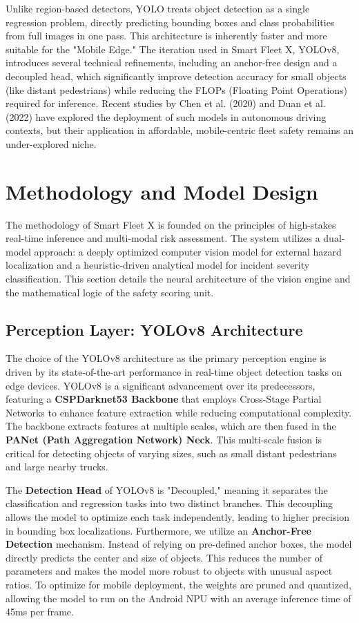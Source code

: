 \documentclass[conference]{IEEEtran}
\begin{document}
Unlike region-based detectors, YOLO treats object detection as a single regression problem, directly predicting bounding boxes and class probabilities from full images in one pass. This architecture is inherently faster and more suitable for the "Mobile Edge." The iteration used in Smart Fleet X, YOLOv8, introduces several technical refinements, including an anchor-free design and a decoupled head, which significantly improve detection accuracy for small objects (like distant pedestrians) while reducing the FLOPs (Floating Point Operations) required for inference. Recent studies by Chen et al. (2020) and Duan et al. (2022) have explored the deployment of such models in autonomous driving contexts, but their application in affordable, mobile-centric fleet safety remains an under-explored niche.

\section{Methodology and Model Design}

The methodology of Smart Fleet X is founded on the principles of high-stakes real-time inference and multi-modal risk assessment. The system utilizes a dual-model approach: a deeply optimized computer vision model for external hazard localization and a heuristic-driven analytical model for incident severity classification. This section details the neural architecture of the vision engine and the mathematical logic of the safety scoring unit.

\subsection{Perception Layer: YOLOv8 Architecture}
The choice of the YOLOv8 architecture as the primary perception engine is driven by its state-of-the-art performance in real-time object detection tasks on edge devices. YOLOv8 is a significant advancement over its predecessors, featuring a \textbf{CSPDarknet53 Backbone} that employs Cross-Stage Partial Networks to enhance feature extraction while reducing computational complexity. The backbone extracts features at multiple scales, which are then fused in the \textbf{PANet (Path Aggregation Network) Neck}. This multi-scale fusion is critical for detecting objects of varying sizes, such as small distant pedestrians and large nearby trucks.

The \textbf{Detection Head} of YOLOv8 is "Decoupled," meaning it separates the classification and regression tasks into two distinct branches. This decoupling allows the model to optimize each task independently, leading to higher precision in bounding box localizations. Furthermore, we utilize an \textbf{Anchor-Free Detection} mechanism. Instead of relying on pre-defined anchor boxes, the model directly predicts the center and size of objects. This reduces the number of parameters and makes the model more robust to objects with unusual aspect ratios. To optimize for mobile deployment, the weights are pruned and quantized, allowing the model to run on the Android NPU with an average inference time of 45ms per frame.
\end{document}
